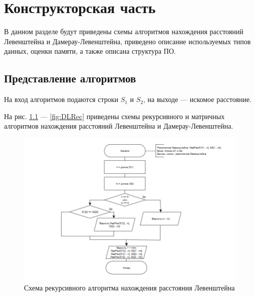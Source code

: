 \chapter{Конструкторская часть}
В данном разделе будут приведены схемы алгоритмов нахождения расстояний Левенштейна и Дамерау-Левенштейна, приведено описание используемых типов данных, оценки памяти, а также описана структура ПО.

\section{Представление алгоритмов}

На вход алгоритмов подаются строки $S_{1}$ и $S_{2}$, на выходе --- искомое расстояние.

На рис. \ref{fig:LRec} --- \ref{fig:DLRec} приведены схемы рекурсивного и матричных алгоритмов нахождения расстояний Левенштейна и Дамерау-Левенштейна.

\clearpage

\begin{figure}[h]
	\centering
	\includegraphics[scale=0.8]{images/lev_rec.png}
	\caption{Схема рекурсивного алгоритма нахождения расстояния Левенштейна}
	\label{fig:LRec}
\end{figure}

\clearpage

